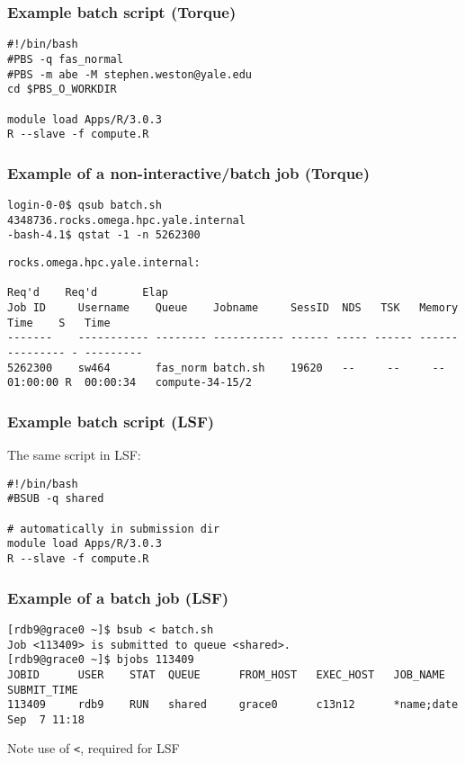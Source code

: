 \documentclass[10pt]{beamer}
\newcommand\tinyfont{\fontsize{4pt}{7.2}\selectfont}
\newcommand\smallfont{\fontsize{8pt}{7.2}\selectfont}
\newcommand\regfont{\fontsize{10pt}{7.2}\selectfont}
\begin{document}
\begin{frame}[fragile]
\frametitle{Example batch script (Torque)}

\begin{block}{}
\begin{verbatim}
#!/bin/bash
#PBS -q fas_normal
#PBS -m abe -M stephen.weston@yale.edu
cd $PBS_O_WORKDIR

module load Apps/R/3.0.3
R --slave -f compute.R
\end{verbatim}
\end{block}
\end{frame}

\begin{frame}[fragile]
\frametitle{Example of a non-interactive/batch job (Torque)}
\smallfont
\begin{verbatim}
login-0-0$ qsub batch.sh
4348736.rocks.omega.hpc.yale.internal
-bash-4.1$ qstat -1 -n 5262300
\end{verbatim}
\tinyfont
\begin{verbatim}
rocks.omega.hpc.yale.internal: 
                                                                                  Req'd    Req'd       Elap
Job ID     Username    Queue    Jobname     SessID  NDS   TSK   Memory   Time    S   Time
-------    ----------- -------- ----------- ------ ----- ------ ------ --------- - ---------
5262300    sw464       fas_norm batch.sh    19620   --     --     --   01:00:00 R  00:00:34   compute-34-15/2

\end{verbatim}
\end{frame}

\begin{frame}[fragile]
\frametitle{Example batch script (LSF)}
The same script in LSF:

\begin{block}{}
\begin{verbatim}
#!/bin/bash
#BSUB -q shared

# automatically in submission dir
module load Apps/R/3.0.3
R --slave -f compute.R
\end{verbatim}
\end{block}
\end{frame}

\begin{frame}[fragile]
\frametitle{Example of a batch job (LSF)}
\smallfont
\begin{verbatim}
[rdb9@grace0 ~]$ bsub < batch.sh
Job <113409> is submitted to queue <shared>.
[rdb9@grace0 ~]$ bjobs 113409
JOBID      USER    STAT  QUEUE      FROM_HOST   EXEC_HOST   JOB_NAME   SUBMIT_TIME
113409     rdb9    RUN   shared     grace0      c13n12      *name;date Sep  7 11:18
\end{verbatim}

\regfont
\vskip14pt
Note use of \verb+<+, required for LSF
\end{frame}
\end{document}

